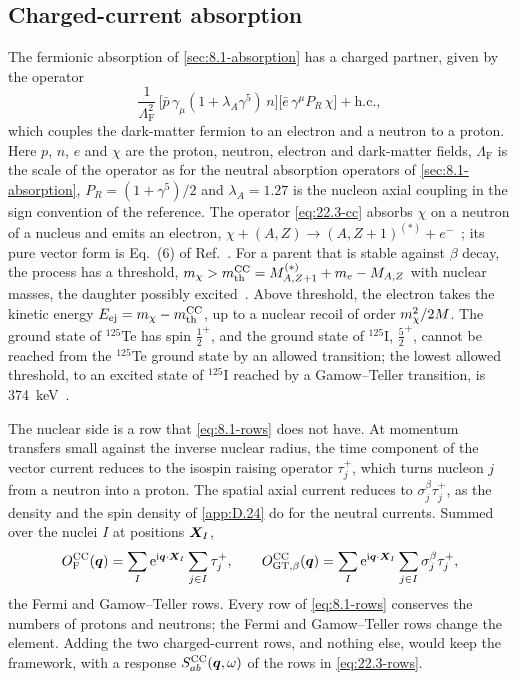 \subsection{Charged-current absorption}\label{sec:22.3-cc}

The fermionic absorption of \cref{sec:8.1-absorption} has a charged partner, given by the operator
\begin{equation}
  \frac{1}{\Lambda_{\mathrm{F}}^2}\,\bigl[\bar p\,\gamma_\mu(1 + \lambda_A\gamma^5)\,n\bigr]\bigl[\bar e\,\gamma^\mu P_R\,\chi\bigr] + \text{h.c.} ,
  \label{eq:22.3-cc}
\end{equation}
which couples the dark-matter fermion to an electron and a neutron to a proton. Here $p$, $n$, $e$ and $\chi$ are the proton, neutron, electron and dark-matter fields, $\Lambda_{\mathrm{F}}$ is the scale of the operator as for the neutral absorption operators of \cref{sec:8.1-absorption}, $P_R = (1 + \gamma^5)/2$ and $\lambda_A = 1.27$ is the nucleon axial coupling in the sign convention of the reference. The operator \cref{eq:22.3-cc} absorbs $\chi$ on a neutron of a nucleus and emits an electron, $\chi + (A, Z) \to (A, Z+1)^{(*)} + e^-$~\cite[Eq.~(4.1)]{dror2020absorption}; its pure vector form is Eq.~(6) of Ref.~\cite{dror2020direct}. For a parent that is stable against $\beta$ decay, the process has a threshold, $m_{\chi} > m_{\mathrm{th}}^{\mathrm{CC}} = M_{A,Z+1}^{(*)} + m_e - M_{A,Z}$ with nuclear masses, the daughter possibly excited~\cite[Eq.~(4.2)]{dror2020absorption}. Above threshold, the electron takes the kinetic energy $E_{\mathrm{ej}} = m_{\chi} - m_{\mathrm{th}}^{\mathrm{CC}}$, up to a nuclear recoil of order $m_{\chi}^2/2M$. The ground state of $^{125}$Te has spin $\frac12^+$, and the ground state of $^{125}$I, $\frac52^+$, cannot be reached from the $^{125}$Te ground state by an allowed transition; the lowest allowed threshold, to an excited state of $^{125}$I reached by a Gamow--Teller transition, is \SI{374}{keV}~\cite[Table~1]{dror2020absorption}.

The nuclear side is a row that \cref{eq:8.1-rows} does not have. At momentum transfers small against the inverse nuclear radius, the time component of the vector current reduces to the isospin raising operator $\tau^+_j$, which turns nucleon $j$ from a neutron into a proton. The spatial axial current reduces to $\sigma^\beta_j\tau^+_j$, as the density and the spin density of \cref{app:D.24} do for the neutral currents. Summed over the nuclei $I$ at positions $\bm{X}_I$,
\begin{equation}
  O^{\mathrm{CC}}_{\mathrm{F}}(\bm{q}) = \sum_I\mathrm{e}^{\mathrm{i}\bm{q}\cdot\bm{X}_I}\sum_{j\in I}\tau^+_j , \qquad
  O^{\mathrm{CC}}_{\mathrm{GT},\beta}(\bm{q}) = \sum_I\mathrm{e}^{\mathrm{i}\bm{q}\cdot\bm{X}_I}\sum_{j\in I}\sigma^\beta_j\tau^+_j ,
  \label{eq:22.3-rows}
\end{equation}
the Fermi and Gamow--Teller rows. Every row of \cref{eq:8.1-rows} conserves the numbers of protons and neutrons; the Fermi and Gamow--Teller rows change the element. Adding the two charged-current rows, and nothing else, would keep the framework, with a response $S^{\mathrm{CC}}_{ab}(\bm{q}, \omega)$ of the rows in \cref{eq:22.3-rows}.

